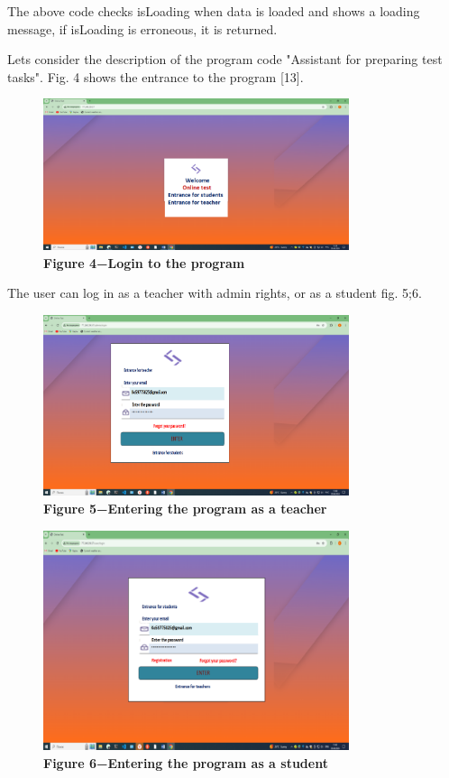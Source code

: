The above code checks isLoading when data is loaded and shows a loading
message, if isLoading is erroneous, it is returned.

Let\textquotesingle s consider the description of the program code
"Assistant for preparing test tasks". Fig. 4 shows the entrance to the
program {[}13{]}.

\begin{figure}[H]
	\centering
	\includegraphics[width=0.8\textwidth]{assets/129}
	\caption*{\bfseries Figure 4−Login to the program}
\end{figure}

The user can log in as a teacher with admin rights, or as a student fig.
5;6.

\begin{figure}[H]
	\centering
	\includegraphics[width=0.8\textwidth]{assets/130}
	\caption*{\bfseries Figure 5−Entering the program as a teacher}
\end{figure}


\begin{figure}[H]
	\centering
	\includegraphics[width=0.8\textwidth]{assets/131}
	\caption*{\bfseries Figure 6−Entering the program as a student}
\end{figure}

